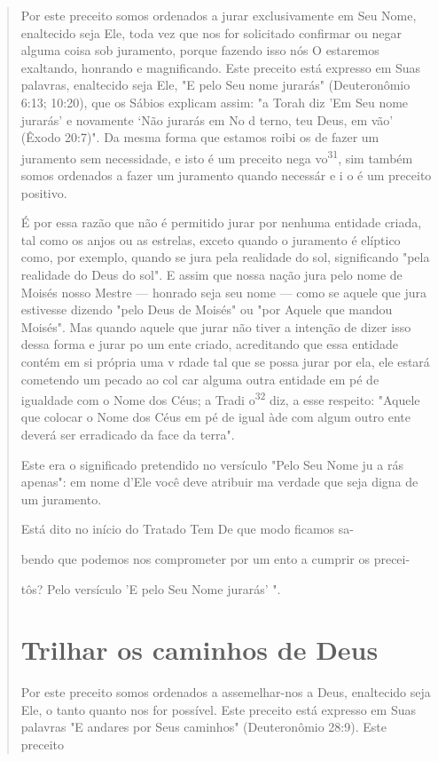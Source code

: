 \begin{quote}
Por este preceito somos ordenados a jurar exclusivamente em Seu Nome,
enaltecido seja Ele, toda vez que nos for solicitado confirmar ou negar
alguma coisa sob juramento, porque fazendo isso nós O estaremos
exaltando, honrando e magnificando. Este preceito está expresso em Suas
palavras, enal­tecido seja Ele, "E pelo Seu nome jurarás" (Deuteronômio
6:13; 10:20), que os Sábios explicam assim: "a Torah diz 'Em Seu nome
jurarás' e novamente `Não jurarás em No d terno, teu Deus, em vão'
(Êxodo 20:7)". Da mesma forma que estamos roibi os de fazer um juramento
sem necessidade, e isto é um preceito nega vo\textsuperscript{31}, sim
também somos ordenados a fazer um juramen­to quando necessár {e} i o é
um preceito positivo.

É por essa razão que não é permitido jurar por nenhuma entidade criada,
tal como os anjos ou as estrelas, exceto quando o juramento é elíptico
como, por exemplo, quando se jura pela realidade do sol, significando
"pela realidade do Deus do sol". E assim que nossa nação jura pelo nome
de Moisés nosso Mestre --- honrado seja seu nome --- como se aquele que
jura estivesse dizendo "pelo Deus de Moisés" ou "por Aquele que mandou
Moisés". Mas quan­do aquele que jurar não tiver a intenção de dizer isso
dessa forma e jurar po um ente criado, acreditando que essa entidade
contém em si própria uma v r­dade tal que se possa jurar por ela, ele
estará cometendo um pecado ao col car alguma outra entidade em pé de
igualdade com o Nome dos Céus; a Tradi o\textsuperscript{32} diz, a esse
respeito: "Aquele que colocar o Nome dos Céus em pé de igual àde com
algum outro ente deverá ser erradicado da face da terra".

Este era o significado pretendido no versículo "Pelo Seu Nome ju a­ rás
apenas": em nome d'Ele você deve atribuir ma verdade que seja digna de
um juramento.

Está dito no início do Tratado Tem De que modo ficamos sa-

bendo que podemos nos comprometer por um ento a cumprir os precei-

tôs? Pelo versículo 'E pelo Seu Nome jurarás' ".

\section{Trilhar os caminhos de Deus}

Por este preceito somos ordenados a assemelhar-nos a Deus, enalte­cido
seja Ele, o tanto quanto nos for possível. Este preceito está expresso
em Suas palavras "E andares por Seus caminhos" (Deuteronômio 28:9). Este
preceito
\end{quote}

